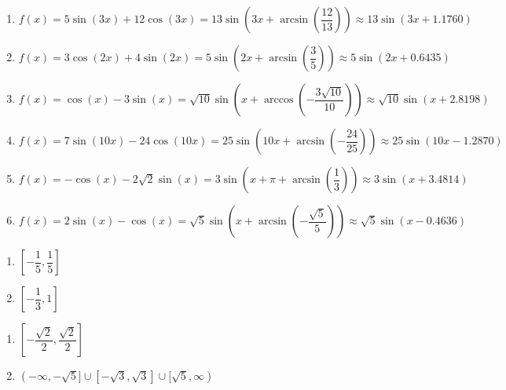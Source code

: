 \begin{enumerate}

\setcounter{enumi}{\value{HW}}

\item $f(x) = 5\sin(3x) + 12\cos(3x) = 13\sin\left(3x + \arcsin\left(\dfrac{12}{13}\right)\right) \approx 13\sin(3x + 1.1760)$
\item $f(x) = 3\cos(2x) + 4\sin(2x) = 5\sin\left(2x+\arcsin\left(\dfrac{3}{5}\right) \right) \approx 5\sin(2x+0.6435)$
\item $f(x) = \cos(x) - 3\sin(x) = \sqrt{10} \sin\left(x + \arccos\left(-\dfrac{3\sqrt{10}}{10} \right)\right) \approx \sqrt{10} \sin(x + 2.8198)$
\item  $f(x) = 7\sin(10x) - 24\cos(10x) = 25\sin\left( 10x + \arcsin\left(-\dfrac{24}{25}\right)\right) \approx 25 \sin(10x-1.2870)$
\item  $f(x) = -\cos(x) - 2\sqrt{2} \sin(x) = 3\sin\left(x+\pi + \arcsin\left(\dfrac{1}{3}\right)\right) \approx 3\sin(x+3.4814)$
\item $f(x) = 2\sin(x) - \cos(x) = \sqrt{5}\sin\left(x  + \arcsin\left(-\dfrac{\sqrt{5}}{5}\right)\right) \approx \sqrt{5}\sin(x -0.4636)$

\setcounter{HW}{\value{enumi}}

\end{enumerate}

\begin{multicols}{2}

\begin{enumerate}

\setcounter{enumi}{\value{HW}}

\item  $\left[-\dfrac{1}{5}, \dfrac{1}{5}\right]$
\item  $\left[-\dfrac{1}{3}, 1 \right]$

\setcounter{HW}{\value{enumi}}

\end{enumerate}

\end{multicols}

\begin{multicols}{2}

\begin{enumerate}

\setcounter{enumi}{\value{HW}}

\item   $\left[-\dfrac{\sqrt{2}}{2}, \dfrac{\sqrt{2}}{2}\right]$ 
\item  $(-\infty, -\sqrt{5}] \cup [-\sqrt{3}, \sqrt{3}] \cup [\sqrt{5}, \infty)$ 

\setcounter{HW}{\value{enumi}}

\end{enumerate}

\end{multicols}

